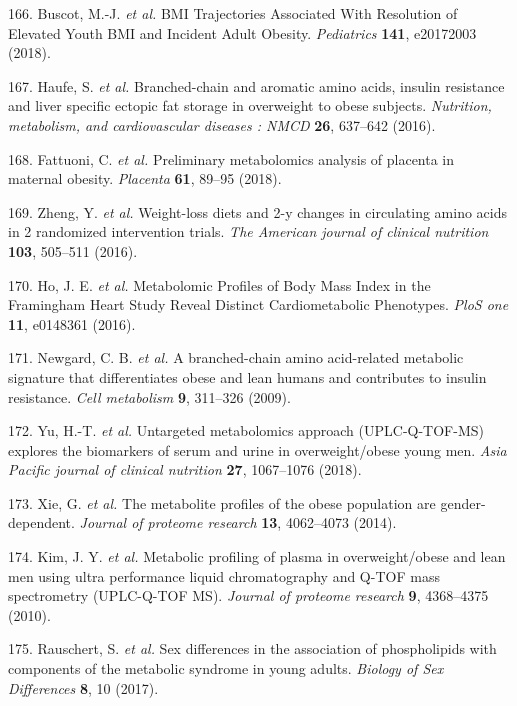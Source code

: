 \documentclass[11pt,twoside]{bristolthesis}
\begin{document}
\leavevmode\hypertarget{ref-Buscot2018}{}%
166. Buscot, M.-J. \emph{et al.} BMI Trajectories Associated With Resolution of Elevated Youth BMI and Incident Adult Obesity. \emph{Pediatrics} \textbf{141}, e20172003 (2018).

\leavevmode\hypertarget{ref-Haufe2016}{}%
167. Haufe, S. \emph{et al.} Branched-chain and aromatic amino acids, insulin resistance and liver specific ectopic fat storage in overweight to obese subjects. \emph{Nutrition, metabolism, and cardiovascular diseases : NMCD} \textbf{26}, 637--642 (2016).

\leavevmode\hypertarget{ref-Fattuoni2018}{}%
168. Fattuoni, C. \emph{et al.} Preliminary metabolomics analysis of placenta in maternal obesity. \emph{Placenta} \textbf{61}, 89--95 (2018).

\leavevmode\hypertarget{ref-Zheng2016}{}%
169. Zheng, Y. \emph{et al.} Weight-loss diets and 2-y changes in circulating amino acids in 2 randomized intervention trials. \emph{The American journal of clinical nutrition} \textbf{103}, 505--511 (2016).

\leavevmode\hypertarget{ref-Ho2016}{}%
170. Ho, J. E. \emph{et al.} Metabolomic Profiles of Body Mass Index in the Framingham Heart Study Reveal Distinct Cardiometabolic Phenotypes. \emph{PloS one} \textbf{11}, e0148361 (2016).

\leavevmode\hypertarget{ref-Newgard2009}{}%
171. Newgard, C. B. \emph{et al.} A branched-chain amino acid-related metabolic signature that differentiates obese and lean humans and contributes to insulin resistance. \emph{Cell metabolism} \textbf{9}, 311--326 (2009).

\leavevmode\hypertarget{ref-Yu2018}{}%
172. Yu, H.-T. \emph{et al.} Untargeted metabolomics approach (UPLC-Q-TOF-MS) explores the biomarkers of serum and urine in overweight/obese young men. \emph{Asia Pacific journal of clinical nutrition} \textbf{27}, 1067--1076 (2018).

\leavevmode\hypertarget{ref-Xie2014}{}%
173. Xie, G. \emph{et al.} The metabolite profiles of the obese population are gender-dependent. \emph{Journal of proteome research} \textbf{13}, 4062--4073 (2014).

\leavevmode\hypertarget{ref-Kim2010b}{}%
174. Kim, J. Y. \emph{et al.} Metabolic profiling of plasma in overweight/obese and lean men using ultra performance liquid chromatography and Q-TOF mass spectrometry (UPLC-Q-TOF MS). \emph{Journal of proteome research} \textbf{9}, 4368--4375 (2010).

\leavevmode\hypertarget{ref-Rauschert2017}{}%
175. Rauschert, S. \emph{et al.} Sex differences in the association of phospholipids with components of the metabolic syndrome in young adults. \emph{Biology of Sex Differences} \textbf{8}, 10 (2017).
\end{document}
